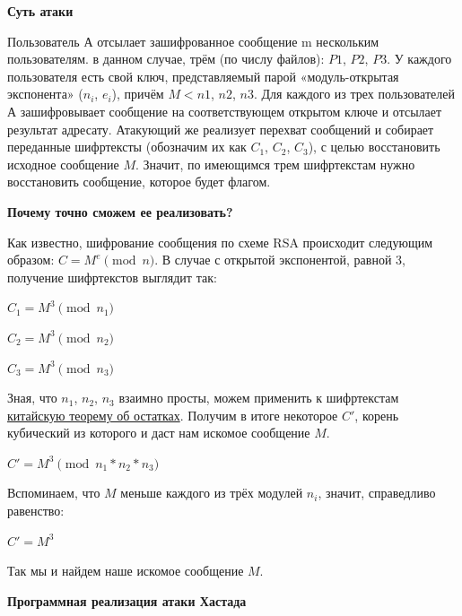 \documentclass[idxtotoc,hyperref,openany,oneside]{files/crypto} %
\begin{document}
\textbf{Суть атаки}

Пользователь $А$ отсылает зашифрованное сообщение m нескольким пользователям. в данном случае, трём (по числу файлов): $P1$, $P2$, $P3$. У каждого пользователя есть свой ключ, представляемый парой «модуль-открытая экспонента» ($n_i$, $e_i$), причём $M < n1$, $n2$, $n3$. Для каждого из трех пользователей $А$ зашифровывает сообщение на соответствующем открытом ключе и отсылает результат адресату.
Атакующий же реализует перехват сообщений и собирает переданные шифртексты (обозначим их как $C_1$, $C_2$, $C_3$), с целью восстановить исходное сообщение $M$. Значит, по имеющимся трем шифртекстам нужно восстановить сообщение, которое будет флагом.

\textbf{Почему точно сможем ее реализовать?}

Как известно, шифрование сообщения по схеме RSA происходит следующим образом: $C = M^e \pmod{n}$. В случае с открытой экспонентой, равной 3, получение шифртекстов выглядит так:
\begin{center}
$C_1 = M^3 \pmod{n_1}$

$C_2 = M^3 \pmod{n_2}$

$C_3 = M^3 \pmod{n_3}$
\end{center}
Зная, что $n_1$, $n_2$, $n_3$ взаимно просты, можем применить к шифртекстам \href{https://ru.wikipedia.org/wiki/\%D0\%9A\%D0\%B8\%D1\%82\%D0\%B0\%D0\%B9\%D1\%81\%D0\%BA\%D0\%B0\%D1\%8F_\%D1\%82\%D0\%B5\%D0\%BE\%D1\%80\%D0\%B5\%D0\%BC\%D0\%B0_\%D0\%BE\%D0\%B1_\%D0\%BE\%D1\%81\%D1\%82\%D0\%B0\%D1\%82\%D0\%BA\%D0\%B0\%D1\%85}{китайскую теорему об остатках}. Получим в итоге некоторое $C'$, корень кубический из которого и даст нам искомое сообщение $M$.
\begin{center}
$C' = M^3 \pmod{n_1*n_2*n_3}$
\end{center}
Вспоминаем, что $M$ меньше каждого из трёх модулей $n_i$, значит, справедливо равенство:
\begin{center}
$C' = M^3$
\end{center}
Так мы и найдем наше искомое сообщение $M$.

\textbf{Программная реализация атаки Хастада}
\end{document}
